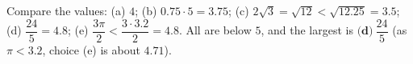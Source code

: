 Compare the values: (a) $4$; (b) $0.75\cdot5=3.75$; (c) $2\sqrt3=\sqrt{12}<\sqrt{12.25}=3.5$; (d) $\dfrac{24}{5}=4.8$; (e) $\dfrac{3\pi}{2}<\dfrac{3\cdot3.2}{2}=4.8$. All are below $5$, and the largest is $\boxed{\textbf{(d)}\ \dfrac{24}{5}}$ (as $\pi<3.2$, choice (e) is about $4.71$).
